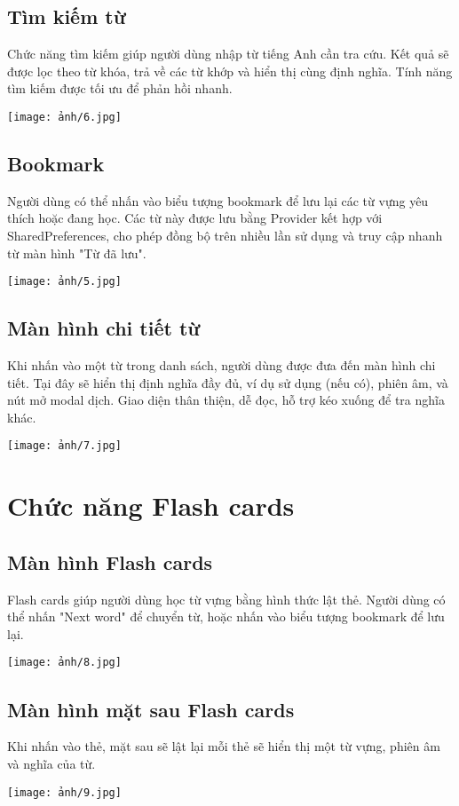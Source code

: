 \subsection{Tìm kiếm từ}
Chức năng tìm kiếm giúp người dùng nhập từ tiếng Anh cần tra cứu. Kết quả sẽ được lọc theo từ khóa, trả về các từ khớp và hiển thị cùng định nghĩa. Tính năng tìm kiếm được tối ưu để phản hồi nhanh.
\begin{center}
\texttt{[image: ảnh/6.jpg]}
\end{center}
\subsection{Bookmark}
Người dùng có thể nhấn vào biểu tượng bookmark để lưu lại các từ vựng yêu thích hoặc đang học. Các từ này được lưu bằng Provider kết hợp với SharedPreferences, cho phép đồng bộ trên nhiều lần sử dụng và truy cập nhanh từ màn hình "Từ đã lưu".
\begin{center}
\texttt{[image: ảnh/5.jpg]}
\end{center}
\subsection{Màn hình chi tiết từ}
Khi nhấn vào một từ trong danh sách, người dùng được đưa đến màn hình chi tiết. Tại đây sẽ hiển thị định nghĩa đầy đủ, ví dụ sử dụng (nếu có), phiên âm, và nút mở modal dịch. Giao diện thân thiện, dễ đọc, hỗ trợ kéo xuống để tra nghĩa khác.
\begin{center}
\texttt{[image: ảnh/7.jpg]}
\end{center}

\section{Chức năng Flash cards}
\subsection{Màn hình Flash cards}
Flash cards giúp người dùng học từ vựng bằng hình thức lật thẻ. Người dùng có thể nhấn "Next word" để chuyển từ, hoặc nhấn vào biểu tượng bookmark để lưu lại.
\begin{center}
\texttt{[image: ảnh/8.jpg]}
\end{center}
\subsection{Màn hình mặt sau Flash cards }
 Khi nhấn vào thẻ, mặt sau sẽ lật lại mỗi thẻ sẽ hiển thị một từ vựng, phiên âm và nghĩa của từ.
\begin{center}
\texttt{[image: ảnh/9.jpg]}
\end{center}

